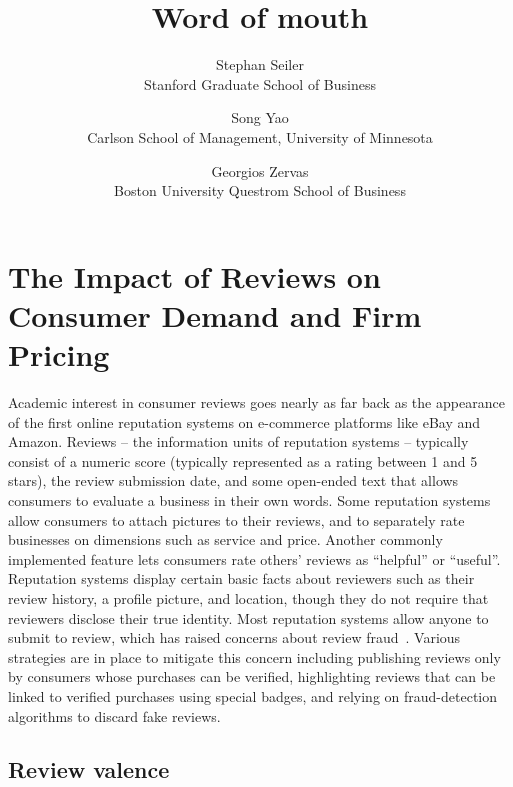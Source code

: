 \documentclass[letter,12pt]{article}
\begin{document}
\title{Word of mouth}
\author{
	Stephan Seiler \\
	Stanford Graduate School of Business
	\and
	Song Yao \\
	Carlson School of Management, University of Minnesota
	\and
	Georgios Zervas \\
	Boston University Questrom School of Business
}
\maketitle

\doublespacing

\section{The Impact of Reviews on Consumer Demand and Firm Pricing}

Academic interest in consumer reviews goes nearly as far back as the
appearance of the first online reputation systems on e-commerce platforms like
eBay and Amazon. Reviews -- the information units of reputation systems --
typically consist of a numeric score (typically represented as a rating
between 1 and 5 stars), the review submission date, and some open-ended text
that allows consumers to evaluate a business in their own words. Some
reputation systems allow consumers to attach pictures to their reviews, and to
separately rate businesses on dimensions such as service and price. Another
commonly implemented feature lets consumers rate others' reviews as
``helpful'' or ``useful''. Reputation systems display certain basic facts
about reviewers such as their review history, a profile picture, and location,
though they do not require that reviewers disclose their true identity. Most
reputation systems allow anyone to submit to review, which has raised concerns
about review fraud~\citep{mayzlin2014promotional,luca2016fake}. Various
strategies are in place to mitigate this concern including publishing reviews
only by consumers whose purchases can be verified, highlighting reviews that
can be linked to verified purchases using special badges, and relying on
fraud-detection algorithms to discard fake reviews.

\subsection{Review valence}
\end{document}
